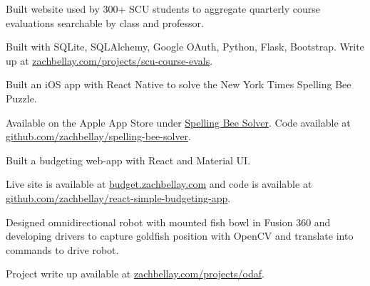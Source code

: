 \documentclass[]{deedy-resume-openfont}
\begin{document}
\begin{minipage}[t]{0.70\textwidth}
\begin{tightemize}
\item Built website used by 300+ SCU students to aggregate quarterly course evaluations searchable by class and professor.
\item Built with SQLite, SQLAlchemy, Google OAuth, Python, Flask, Bootstrap. Write up at \href{https://zachbellay.com/projects/scu-course-evals}{zachbellay.com/projects/scu-course-evals}.
\end{tightemize}
\sectionsep

\begin{tightemize}
\item Built an iOS app with React Native to solve the New York Times Spelling Bee Puzzle.
\item Available on the Apple App Store under \href{https://apps.apple.com/us/app/spelling-bee-solver/id1585042294}{Spelling Bee Solver}. Code available at \href{https://github.com/zachbellay/spelling-bee-solver}{github.com/zachbellay/spelling-bee-solver}. 
\end{tightemize}
\sectionsep

\begin{tightemize}
\item Built a budgeting web-app with React and Material UI. 
\item Live site is available at \href{https://budget.zachbellay.com}{budget.zachbellay.com} and code is available at \href{https://github.com/zachbellay/react-simple-budgeting-app}{github.com/zachbellay/react-simple-budgeting-app}.

\end{tightemize}
\sectionsep

\begin{tightemize}

\item Designed omnidirectional robot with mounted fish bowl in Fusion 360 and developing drivers to capture goldfish position with OpenCV and translate into commands to drive robot.
\item Project write up available at \href{https://zachbellay.com/projects/odaf/}{zachbellay.com/projects/odaf}.
\end{tightemize}
\sectionsep


\end{minipage}
\end{document}
